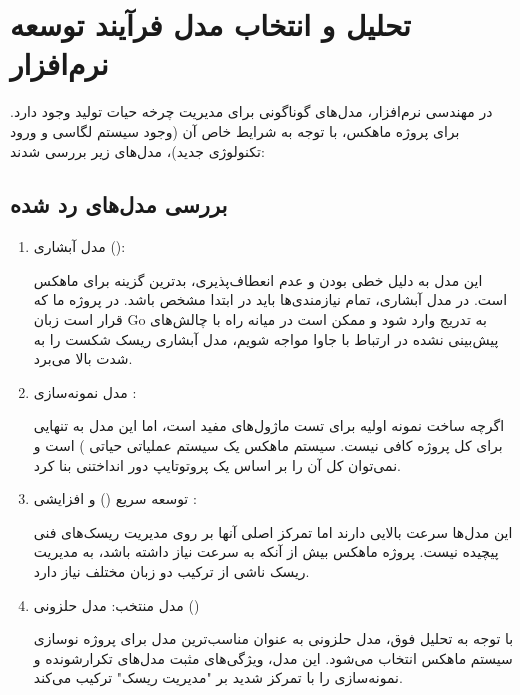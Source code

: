 \documentclass[12pt,a4paper]{report}
\begin{document}
\section{ تحلیل و انتخاب مدل فرآیند توسعه نرم‌افزار}

در مهندسی نرم‌افزار، مدل‌های گوناگونی برای مدیریت چرخه حیات تولید وجود دارد. برای پروژه ماهکس، با توجه به شرایط خاص آن (وجود سیستم لگاسی و ورود تکنولوژی جدید)، مدل‌های زیر بررسی شدند:

\subsection{ بررسی مدل‌های رد شده}
\begin{enumerate}
	\item 
مدل آبشاری (): 

این مدل به دلیل خطی بودن و عدم انعطاف‌پذیری، بدترین گزینه برای ماهکس است. در مدل آبشاری، تمام نیازمندی‌ها باید در ابتدا مشخص باشد. در پروژه ما که قرار است زبان Go به تدریج وارد شود و ممکن است در میانه راه با چالش‌های پیش‌بینی نشده در ارتباط با جاوا مواجه شویم، مدل آبشاری ریسک شکست را به شدت بالا می‌برد.
\item 
مدل نمونه‌سازی :

 اگرچه ساخت نمونه اولیه برای تست ماژول‌های  مفید است، اما این مدل به تنهایی برای کل پروژه کافی نیست. سیستم ماهکس یک سیستم عملیاتی حیاتی ) است و نمی‌توان کل آن را بر اساس یک پروتوتایپ دور انداختنی بنا کرد.
\item 
توسعه سریع () و افزایشی : 

این مدل‌ها سرعت بالایی دارند اما تمرکز اصلی آنها بر روی مدیریت ریسک‌های فنی پیچیده نیست. پروژه ماهکس بیش از آنکه به سرعت نیاز داشته باشد، به مدیریت ریسک ناشی از ترکیب دو زبان مختلف نیاز دارد.
\item 
مدل منتخب: مدل حلزونی ()

با توجه به تحلیل فوق، مدل حلزونی به عنوان مناسب‌ترین مدل برای پروژه نوسازی سیستم ماهکس انتخاب می‌شود. این مدل، ویژگی‌های مثبت مدل‌های تکرارشونده و نمونه‌سازی را با تمرکز شدید بر "مدیریت ریسک" ترکیب می‌کند.
\end{enumerate}
\end{document}
